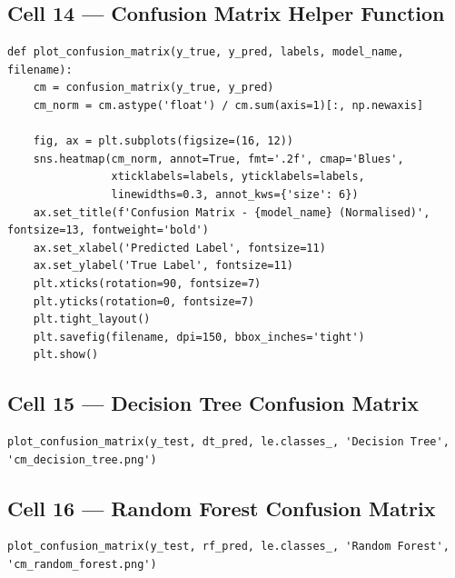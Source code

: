 \documentclass[12pt,a4paper]{article}
\begin{document}
\subsection{Cell 14 --- Confusion Matrix Helper Function}

\begin{lstlisting}[caption=Cell 14: Normalised Confusion Matrix Helper Function]
def plot_confusion_matrix(y_true, y_pred, labels, model_name, filename):
    cm = confusion_matrix(y_true, y_pred)
    cm_norm = cm.astype('float') / cm.sum(axis=1)[:, np.newaxis]

    fig, ax = plt.subplots(figsize=(16, 12))
    sns.heatmap(cm_norm, annot=True, fmt='.2f', cmap='Blues',
                xticklabels=labels, yticklabels=labels,
                linewidths=0.3, annot_kws={'size': 6})
    ax.set_title(f'Confusion Matrix - {model_name} (Normalised)', fontsize=13, fontweight='bold')
    ax.set_xlabel('Predicted Label', fontsize=11)
    ax.set_ylabel('True Label', fontsize=11)
    plt.xticks(rotation=90, fontsize=7)
    plt.yticks(rotation=0, fontsize=7)
    plt.tight_layout()
    plt.savefig(filename, dpi=150, bbox_inches='tight')
    plt.show()
\end{lstlisting}

\subsection{Cell 15 --- Decision Tree Confusion Matrix}

\begin{lstlisting}[caption=Cell 15: Decision Tree Confusion Matrix]
plot_confusion_matrix(y_test, dt_pred, le.classes_, 'Decision Tree', 'cm_decision_tree.png')
\end{lstlisting}

\subsection{Cell 16 --- Random Forest Confusion Matrix}

\begin{lstlisting}[caption=Cell 16: Random Forest Confusion Matrix]
plot_confusion_matrix(y_test, rf_pred, le.classes_, 'Random Forest', 'cm_random_forest.png')
\end{lstlisting}
\end{document}

